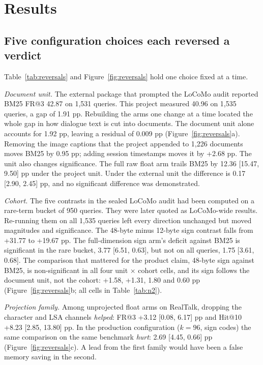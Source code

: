 \documentclass[11pt,a4paper]{article}
\makeatletter
\newcommand{\FR}{FR@3}
\makeatother
\begin{document}
\section{Results}\label{sec:results}
\subsection{Five configuration choices each reversed a verdict}\label{sec:reversals}
Table~\ref{tab:reversals} and Figure~\ref{fig:reversals} hold one choice fixed at a time.

\emph{Document unit.} The external package that prompted the LoCoMo audit reported BM25 \FR{} 42.87 on 1{,}531 queries. This project measured 40.96 on 1{,}535 queries, a gap of 1.91 pp. Rebuilding the arms one change at a time located the whole gap in how dialogue text is cut into documents. The document unit alone accounts for 1.92 pp, leaving a residual of \textminus{}0.009 pp (Figure~\ref{fig:reversals}a). Removing the image captions that the project appended to 1{,}226 documents moves BM25 by \textminus{}0.95 pp; adding session timestamps moves it by +2.68 pp. The unit also changes significance. The full raw float arm trails BM25 by \textminus{}12.36 [\textminus{}15.47, \textminus{}9.50] pp under the project unit. Under the external unit the difference is \textminus{}0.17 [\textminus{}2.90, 2.45] pp, and no significant difference was demonstrated.

\emph{Cohort.} The five contrasts in the sealed LoCoMo audit had been computed on a rare-term bucket of 950 queries. They were later quoted as LoCoMo-wide results. Re-running them on all 1{,}535 queries left every direction unchanged but moved magnitudes and significance. The 48-byte minus 12-byte sign contrast falls from +31.77 to +19.67 pp. The full-dimension sign arm's deficit against BM25 is significant in the rare bucket, \textminus{}3.77 [\textminus{}6.51, \textminus{}0.63], but not on all queries, \textminus{}1.75 [\textminus{}3.61, 0.68]. The comparison that mattered for the product claim, 48-byte sign against BM25, is non-significant in all four unit $\times$ cohort cells, and its sign follows the document unit, not the cohort: +1.58, +1.31, \textminus{}1.80 and \textminus{}0.60 pp (Figure~\ref{fig:reversals}b; all cells in Table~\ref{tab:n2}).

\emph{Projection family.} Among unprojected float arms on RealTalk, dropping the character and LSA channels \emph{helped}: \FR{} +3.12 [0.08, 6.17] pp and Hit@10 +8.23 [2.85, 13.80] pp. In the production configuration ($k=96$, sign codes) the same comparison on the same benchmark \emph{hurt}: \textminus{}2.69 [\textminus{}4.45, \textminus{}0.66] pp (Figure~\ref{fig:reversals}c). A lead from the first family would have been a false memory saving in the second.
\end{document}
